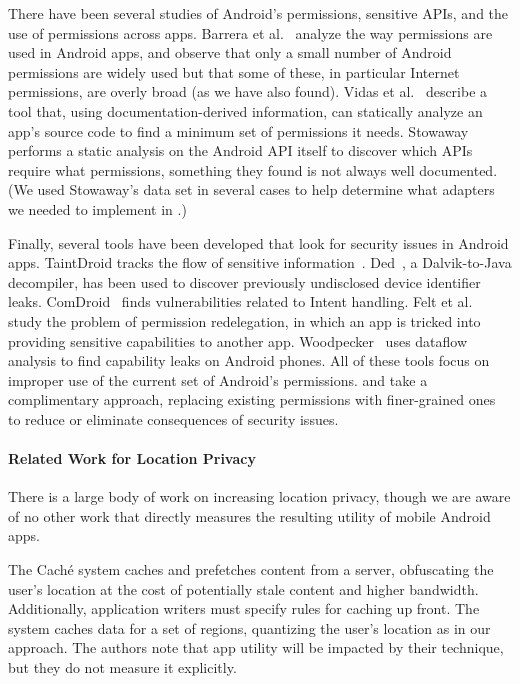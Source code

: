 There have been several studies of Android's permissions, sensitive
APIs, and the use of permissions across apps.  Barrera et
al.~\cite{barrera2010methodology} analyze the way permissions are used
in Android apps, and observe that only a small number of Android
permissions are widely used but that some of these, in particular
Internet permissions, are overly broad (as we have also found). Vidas
et al.~\cite{vidas:w2sp11} describe a tool that, using
documentation-derived information, can statically analyze an app's
source code to find a minimum set of permissions it
needs. Stowaway~\cite{Felt:2011} performs a static analysis on the
Android API itself to discover which APIs require what permissions,
something they found is not always well documented. (We used
Stowaway's data set in several cases to help determine what adapters
we needed to implement in \lib.)

Finally, several tools have been developed that look for security
issues in Android apps. TaintDroid tracks the flow of sensitive
information~\cite{taintdroid}. Ded~\cite{ded}, a Dalvik-to-Java
decompiler, has been used to discover previously undisclosed device
identifier leaks. ComDroid~\cite{chin11:mobisys} finds vulnerabilities
related to Intent handling. Felt et al.~\cite{felt2011permission}
study the problem of permission redelegation, in which an app is
tricked into providing sensitive capabilities to another app.
Woodpecker~\cite{grace:ndss12} uses dataflow analysis to find
capability leaks on Android phones. All of these tools focus on
improper use of the current set of Android's permissions. \rewriter
and \lib take a complimentary approach, replacing existing permissions
with finer-grained ones to reduce or eliminate consequences of
security issues.

\paragraph*{Related Work for Location Privacy}

There is a large body of work on increasing location
privacy, though we are aware of no other work that directly measures
the resulting utility of mobile Android apps.

The Cach\'{e} system \cite{Amini:2010} caches and prefetches
content from a server, obfuscating the user's location at the cost of
potentially stale content and higher bandwidth.  Additionally,
application writers must specify rules for caching up front.  The
system caches data for a set of regions, quantizing the user's location 
as in our approach.  
The authors note that app utility will be impacted by their technique, 
but they do not measure it explicitly.

